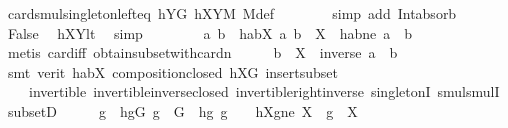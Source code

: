 \begin{isabellebody}
\ card{\isacharunderscore}{\kern0pt}smul{\isacharunderscore}{\kern0pt}singleton{\isacharunderscore}{\kern0pt}left{\isacharunderscore}{\kern0pt}eq\ hYG\ hXYM\ M{\isacharunderscore}{\kern0pt}def\isanewline
\ \ \ \ \ \ \isamarkupfalse%
\ {\isacharparenleft}{\kern0pt}simp\ add{\isacharcolon}{\kern0pt}\ Int{\isacharunderscore}{\kern0pt}absorb{}{\isacharparenright}{\kern0pt}\isanewline
\ \ \ \ \isamarkupfalse%
\ \isamarkupfalse%
\ False\ \isamarkupfalse%
\ hXYlt\ \isamarkupfalse%
\ simp\isanewline
\ \ \isamarkupfalse%
\isanewline
\ \ \isamarkupfalse%
\ \isamarkupfalse%
\ a\ b\ \ habX{\isacharcolon}{\kern0pt}\ {\isachardoublequoteopen}{\isacharbraceleft}{\kern0pt}a{\isacharcomma}{\kern0pt}\ b{\isacharbraceright}{\kern0pt}\ {\isasymsubseteq}\ X{\isachardoublequoteclose}\ \ habne{\isacharcolon}{\kern0pt}\ {\isachardoublequoteopen}a\ {\isasymnoteq}\ b{\isachardoublequoteclose}\ \isamarkupfalse%
\ {\isacharparenleft}{\kern0pt}metis\ card{\isacharunderscore}{\kern0pt}{}{\isacharunderscore}{\kern0pt}iff\ obtain{\isacharunderscore}{\kern0pt}subset{\isacharunderscore}{\kern0pt}with{\isacharunderscore}{\kern0pt}card{\isacharunderscore}{\kern0pt}n{\isacharparenright}{\kern0pt}\isanewline
\ \ \isamarkupfalse%
\ \isamarkupfalse%
\ {\isachardoublequoteopen}b\ {\isasymin}\ X\ {\isasymcdots}\ {\isacharbraceleft}{\kern0pt}inverse\ a\ {\isasymcdot}\ b{\isacharbraceright}{\kern0pt}{\isachardoublequoteclose}\ \isamarkupfalse%
\ {\isacharparenleft}{\kern0pt}smt\ {\isacharparenleft}{\kern0pt}verit{\isacharparenright}{\kern0pt}\ habX\ composition{\isacharunderscore}{\kern0pt}closed\ hXG\ insert{\isacharunderscore}{\kern0pt}subset\ \isanewline
\ \ \ \ invertible\ invertible{\isacharunderscore}{\kern0pt}inverse{\isacharunderscore}{\kern0pt}closed\ invertible{\isacharunderscore}{\kern0pt}right{\isacharunderscore}{\kern0pt}inverse{}\ singletonI\ smul{\isachardot}{\kern0pt}smulI\ subsetD{\isacharparenright}{\kern0pt}\isanewline
\ \ \isamarkupfalse%
\ \isamarkupfalse%
\ g\ \ hgG{\isacharcolon}{\kern0pt}\ {\isachardoublequoteopen}g\ {\isasymin}\ G{\isachardoublequoteclose}\ \ hg{}{\isacharcolon}{\kern0pt}\ {\isachardoublequoteopen}g\ {\isasymnoteq}\ {\isasymone}{\isachardoublequoteclose}\ \ hXgne{\isacharcolon}{\kern0pt}\ {\isachardoublequoteopen}{\isacharparenleft}{\kern0pt}X\ {\isasymcdots}\ {\isacharbraceleft}{\kern0pt}g{\isacharbraceright}{\kern0pt}{\isacharparenright}{\kern0pt}\ {\isasyminter}\ X\ {\isasymnoteq}\ {\isacharbraceleft}{\kern0pt}{\isacharbraceright}{\kern0pt}{\isachardoublequoteclose}\ \isanewline

\end{isabellebody}
